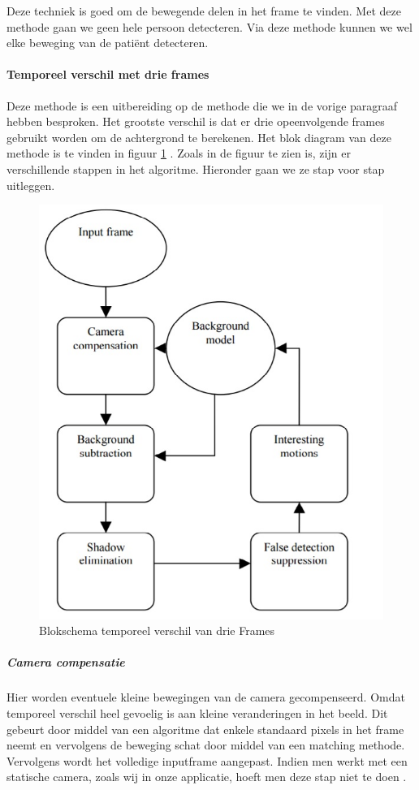Deze techniek is goed om de bewegende delen in het frame te vinden. Met deze methode gaan we geen hele persoon detecteren. Via deze methode kunnen we wel elke beweging van de pati\"ent detecteren.

\paragraph{Temporeel verschil met drie frames}
Deze methode is een uitbereiding op de methode die we in de vorige paragraaf hebben besproken. Het grootste verschil is dat er drie opeenvolgende frames gebruikt worden om de achtergrond te berekenen. Het blok diagram van deze methode is te vinden in figuur \ref{imgTeV} \cite{bibTeV}. 
Zoals in de figuur te zien is, zijn er verschillende stappen in het algoritme. Hieronder gaan we ze stap voor stap uitleggen.
\begin{figure}[hbp]
	\includegraphics[scale=0.6]{TemporeelVerschilDrieFrames}
	\caption{Blokschema temporeel verschil van drie Frames}
	\label{imgTeV}
\end{figure}

\subparagraph{Camera compensatie}
Hier worden eventuele kleine bewegingen van de camera gecompenseerd. Omdat temporeel verschil heel gevoelig is aan kleine veranderingen in het beeld. Dit gebeurt door middel van een algoritme dat enkele standaard pixels in het frame neemt en vervolgens de beweging schat door middel van een matching methode. Vervolgens wordt het volledige inputframe aangepast.  Indien men werkt met een statische camera, zoals wij in onze applicatie, hoeft men deze stap niet te doen \cite{bibTeV}.

